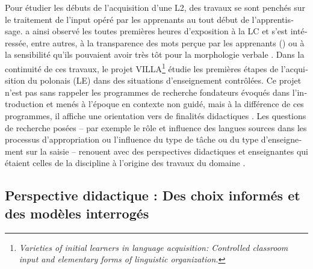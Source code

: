 \documentclass[output=paper]{langscibook}
\begin{document}
\begin{otherlanguage}{french}
Pour étudier les débuts de l’acquisition d’une L2, des travaux se sont penchés sur le traitement de l’input opéré par les apprenants au tout début de l'apprentissage. \citet{Rast2017} a ainsi observé les toutes premières heures d’exposition à la LC et s’est intéressée, entre autres, à la transparence des mots perçue par les apprenants (\citealt{ShoemakerRast2013}) ou à la sensibilité qu’ils pouvaient avoir très tôt pour la morphologie verbale \citep{Rast2006}. Dans la continuité de ces travaux, le projet VILLA\footnote{\textit{Varieties of initial learners in language acquisition: Controlled classroom input and elementary forms of linguistic organization.}} \citep{WatorekEtAl2021eds} étudie les premières étapes de l’acquisition du polonais (LE) dans des situations d’enseignement contrôlées. Ce projet n’est pas sans rappeler les programmes de recherche fondateurs évoqués dans l’introduction et menés à l’époque en contexte non guidé, mais à la différence de ces programmes, il affiche une orientation vers de finalités didactiques \parencites[]{RastEtAl2011}[17–18]{WatorekEtAl2021incol}. Les questions de recherche posées – par exemple le rôle et influence des langues sources dans les processus d’appropriation ou l’influence du type de tâche ou du type d’enseignement sur la saisie – renouent avec des perspectives didactiques et enseignantes qui étaient celles de la discipline à l’origine des travaux du domaine \citep{VéroniqueEtAl2009}.

\subsection{Perspective didactique : Des choix informés et des modèles interrogés}\label{sec:felce:3.2}


\end{otherlanguage}
\end{document}
